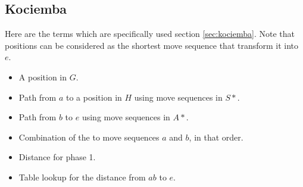 \subsection{Kociemba}
Here are the terms which are specifically used section \ref{sec:kociemba}. Note that positions can be considered as the shortest move sequence that transform it into $e$.
\begin{itemize}
\item {}A position in $G$.
\item {}Path from $a$ to a position in $H$ using move sequences in $S*$.
\item {}Path from $b$ to $e$ using move sequences in $A*$.
\item {}Combination of the to move sequences $a$ and $b$, in that order.
\item {}Distance for phase 1.
\item {}Table lookup for the distance from $ab$ to $e$.
\end{itemize}
